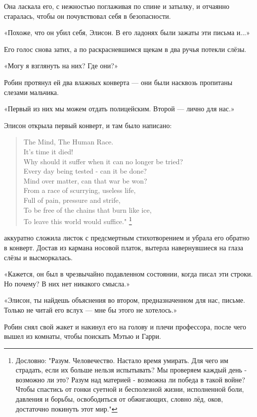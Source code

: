 \documentclass[a4paper,12pt]{book}
\begin{document}
Она ласкала его, с нежностью поглаживая по спине и затылку, и отчаянно старалась, чтобы он почувствовал себя в безопасности.
\par
«Похоже, что он убил себя, Элисон. В его ладонях были зажаты эти письма и...»
\par
Его голос снова затих, а по раскрасневшимся щекам в два ручья потекли слёзы.
\par
«Могу я взглянуть на них? Где они?»
\par
Робин протянул ей два влажных конверта — они были насквозь пропитаны слезами мальчика.
\par
«Первый из них мы можем отдать полицейским. Второй — лично для нас.»
\par
Элисон открыла первый конверт, и там было написано:
\begin{quote}
The Mind, The Human Race.\\
It's time it died!\\
Why should it suffer when it can no longer be tried?\\
Every day being tested - can it be done?\\
Mind over matter, can that war be won?\\
From a race of scurrying, useless life,\\
Full of pain, pressure and strife,\\
To be free of the chains that burn like ice,\\
To leave this world would suffice." \footnote{Дословно: "Разум. Человечество. Настало время умирать. Для чего им страдать, если их больше нельзя испытывать? Мы проверяем каждый день - возможно ли это? Разум над материей - возможна ли победа в такой войне? Чтобы спастись от гонки суетной и бесполезной жизни, исполненной боли, давления и борьбы, освободиться от обжигающих, словно лёд, оков, достаточно покинуть этот мир."}
\end{quote}
\noindent{} аккуратно сложила листок с предсмертным стихотворением и убрала его обратно в конверт. Достав из кармана носовой платок, вытерла навернувшиеся на глаза слёзы и высморкалась.
\par
«Кажется, он был в чрезвычайно подавленном состоянии, когда писал эти строки. Но почему? В них нет никакого смысла.»
\par
«Элисон, ты найдешь объяснения во втором, предназначенном для нас, письме. Только не читай его вслух — мне бы этого не хотелось.»
\par
Робин снял свой жакет и накинул его на голову и плечи профессора, после чего вышел из комнаты, чтобы поискать Мэтью и Гарри.
\end{document}
